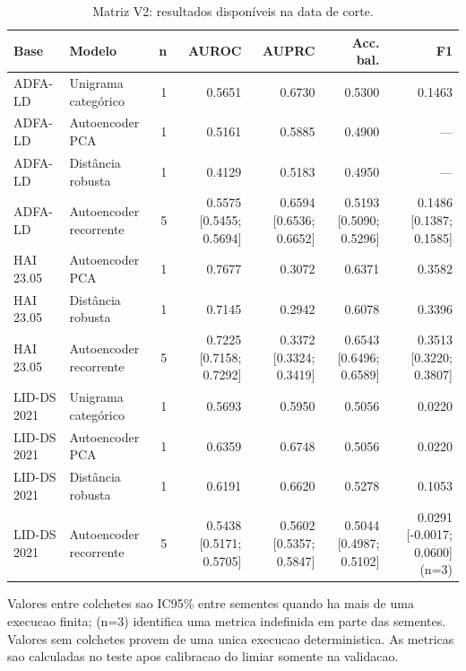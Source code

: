 \begin{table}[htbp]
\centering
\caption{Matriz V2: resultados disponíveis na data de corte.}
\label{tab:matrix-v2-resultados-corte}
\begin{tabular}{llrrrrr}
\toprule
Base & Modelo & n & AUROC & AUPRC & Acc. bal. & F1 \\
\midrule
ADFA-LD & Unigrama categórico & 1 & 0.5651 & 0.6730 & 0.5300 & 0.1463 \\
ADFA-LD & Autoencoder PCA & 1 & 0.5161 & 0.5885 & 0.4900 & — \\
ADFA-LD & Distância robusta & 1 & 0.4129 & 0.5183 & 0.4950 & — \\
ADFA-LD & Autoencoder recorrente & 5 & 0.5575 [0.5455; 0.5694] & 0.6594 [0.6536; 0.6652] & 0.5193 [0.5090; 0.5296] & 0.1486 [0.1387; 0.1585] \\
HAI 23.05 & Autoencoder PCA & 1 & 0.7677 & 0.3072 & 0.6371 & 0.3582 \\
HAI 23.05 & Distância robusta & 1 & 0.7145 & 0.2942 & 0.6078 & 0.3396 \\
HAI 23.05 & Autoencoder recorrente & 5 & 0.7225 [0.7158; 0.7292] & 0.3372 [0.3324; 0.3419] & 0.6543 [0.6496; 0.6589] & 0.3513 [0.3220; 0.3807] \\
LID-DS 2021 & Unigrama categórico & 1 & 0.5693 & 0.5950 & 0.5056 & 0.0220 \\
LID-DS 2021 & Autoencoder PCA & 1 & 0.6359 & 0.6748 & 0.5056 & 0.0220 \\
LID-DS 2021 & Distância robusta & 1 & 0.6191 & 0.6620 & 0.5278 & 0.1053 \\
LID-DS 2021 & Autoencoder recorrente & 5 & 0.5438 [0.5171; 0.5705] & 0.5602 [0.5357; 0.5847] & 0.5044 [0.4987; 0.5102] & 0.0291 [-0.0017; 0.0600] (n=3) \\
\bottomrule
\end{tabular}
\begin{flushleft}
\footnotesize Valores entre colchetes sao IC95\% entre sementes quando ha mais de uma execucao finita; (n=3) identifica uma metrica indefinida em parte das sementes. Valores sem colchetes provem de uma unica execucao deterministica. As metricas sao calculadas no teste apos calibracao do limiar somente na validacao.
\end{flushleft}
\end{table}
